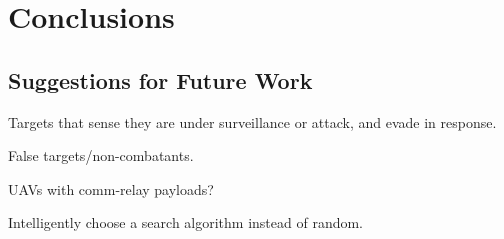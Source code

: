\chapter{Conclusions}


\section{Suggestions for Future Work}
Targets that sense they are under surveillance or attack, and evade in response.

False targets/non-combatants.

UAVs with comm-relay payloads?

Intelligently choose a search algorithm instead of random.
